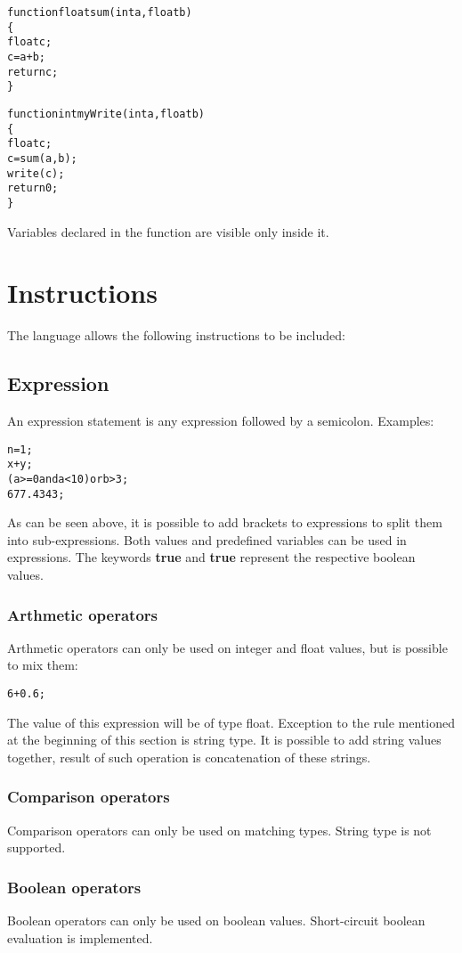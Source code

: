 \documentclass{ol-softwaremanual}
\begin{document}
\begin{alltt}
function float sum(int a, float b)
\{
    float c;
    c = a + b;
    return c;
\}

function int myWrite(int a, float b)
\{
    float c;
    c = sum(a, b);
    write(c);
    return 0;
\}
\end{alltt}

Variables declared in the function are visible only inside it.

\section{Instructions}
The language allows the following instructions to be included:
\subsection{Expression}
An expression statement is any expression followed by a semicolon. 
Examples:
\begin{alltt}
n = 1;
x+y;
(a>= 0 and a<10) or b >3;
677.4343;
\end{alltt}
As can be seen above, it is possible to add brackets to expressions to split them into sub-expressions. Both values and predefined variables can be used in expressions. The keywords \textbf{true} and \textbf{true}  represent the respective boolean values.
\subsubsection{Arthmetic operators}
Arthmetic operators can only be used on integer and float values, but is possible to mix them:
\begin{alltt}
6 + 0.6;
\end{alltt}
The value of this expression will be of type float. Exception to the rule mentioned at the beginning of this section is string type. It is possible to add string values together, result of such operation is concatenation of these strings.
\subsubsection{Comparison operators}
Comparison operators can only be used on matching types. String type is not supported.
\subsubsection{Boolean operators}
Boolean operators can only be used on boolean values. Short-circuit boolean evaluation is implemented.
\end{document}
